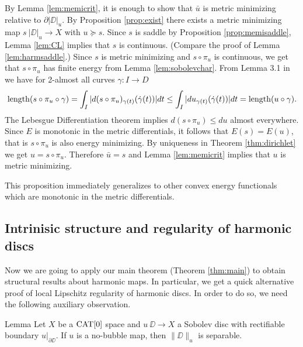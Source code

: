 \documentclass[a4paper,10pt]{amsart}
\begin{document}
By Lemma \ref{lem:memicrit}, it is enough to show that $\bar u$ is metric minimizing relative to $\partial|\DD|_u$.
By Proposition \ref{prop:exist} there exists a metric minimizing map
$s\:|\DD|_u\to X$ with $u\succcurlyeq s$. Since $s$ is saddle by Proposition \ref{prop:memisaddle}, Lemma \ref{lem:CL} implies that $s$
is continuous. (Compare the proof of Lemma \ref{lem:harmsaddle}.) 
Since $s$ is metric minimizing and $s\circ\pi_u$ is continuous, we get that $s\circ\pi_u$ has finite energy from Lemma \ref{lem:sobolevchar}. 
From Lemma 3.1 in \cite{LW3} we have for 2-almost all 
curves $\gamma:I\to D$
$$
\mathop{\rm length}\nolimits(s\circ\pi_u\circ \gamma)=\int_I |d(s\circ\pi_u)_{\gamma(t)}(\dot\gamma(t))|dt\leq \int_I |du_{\gamma(t)}(\dot\gamma(t))|dt=\mathop{\rm length}\nolimits(u\circ \gamma).
$$
The Lebesgue Differentiation theorem implies $d(s\circ\pi_u)\leq du$ almost everywhere. Since $E$ is monotonic in the metric differentials, it follows that 
$E(s)=E(u)$, that is $s\circ\pi_u$ is also energy minimizing.
By uniqueness in Theorem \ref{thm:dirichlet} we get $u=s\circ\pi_u$. Therefore $\bar u=s$ and Lemma \ref{lem:memicrit} implies that $u$
is metric minimizing.
 \qeds
 
 
This proposition immediately generalizes to other convex energy functionals which are monotonic in the metric differentials.
 
 
 
 
 
 
 
 
 
 
 
 
 
 



\subsection{Intrinisic structure and regularity of harmonic discs}                                                      			

Now we are going to apply our main theorem (Theorem \ref{thm:main}) to obtain structural results about harmonic maps. In particular,
we get a quick alternative proof of local Lipschitz regularity of harmonic discs.
In order to do so, we need the following auxiliary observation.

\begin{thm}{Lemma}\label{lem:separable}
Let $X$ be a $\mathop{\rm CAT}\nolimits[0]$ space 
and $u\:\DD\to X$ a Sobolev disc with rectifiable boundary $u|_{\partial \DD}$.
If $u$ is a no-bubble map, then $\|\DD\|_u$ is separable.
\end{thm}
\end{document}
